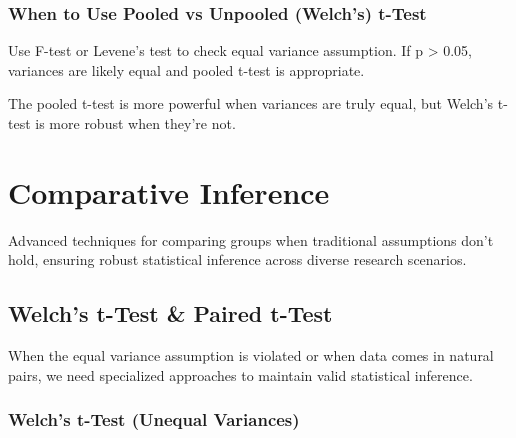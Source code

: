 \documentclass[
  11pt,
  letterpaper,
  oneside]{book}
\begin{document}
\subsection{When to Use Pooled vs Unpooled (Welch's)
t-Test}\label{when-to-use-pooled-vs-unpooled-welchs-t-test}

\begin{tcolorbox}[enhanced jigsaw, left=2mm, opacityback=0, titlerule=0mm, leftrule=.75mm, colbacktitle=quarto-callout-warning-color!10!white, title=\textcolor{quarto-callout-warning-color}{\faExclamationTriangle}\hspace{0.5em}{Testing Equal Variances}, breakable, opacitybacktitle=0.6, rightrule=.15mm, colframe=quarto-callout-warning-color-frame, toprule=.15mm, bottomrule=.15mm, bottomtitle=1mm, toptitle=1mm, coltitle=black, arc=.35mm, colback=white]

Use F-test or Levene's test to check equal variance assumption. If p
\textgreater{} 0.05, variances are likely equal and pooled t-test is
appropriate.

\end{tcolorbox}

The pooled t-test is more powerful when variances are truly equal, but
Welch's t-test is more robust when they're not.


\chapter{Comparative Inference}\label{comparative-inference}

Advanced techniques for comparing groups when traditional assumptions
don't hold, ensuring robust statistical inference across diverse
research scenarios.

\section{Welch's t-Test \& Paired
t-Test}\label{welchs-t-test-paired-t-test}

When the equal variance assumption is violated or when data comes in
natural pairs, we need specialized approaches to maintain valid
statistical inference.

\subsection{Welch's t-Test (Unequal
Variances)}\label{welchs-t-test-unequal-variances}
\end{document}
